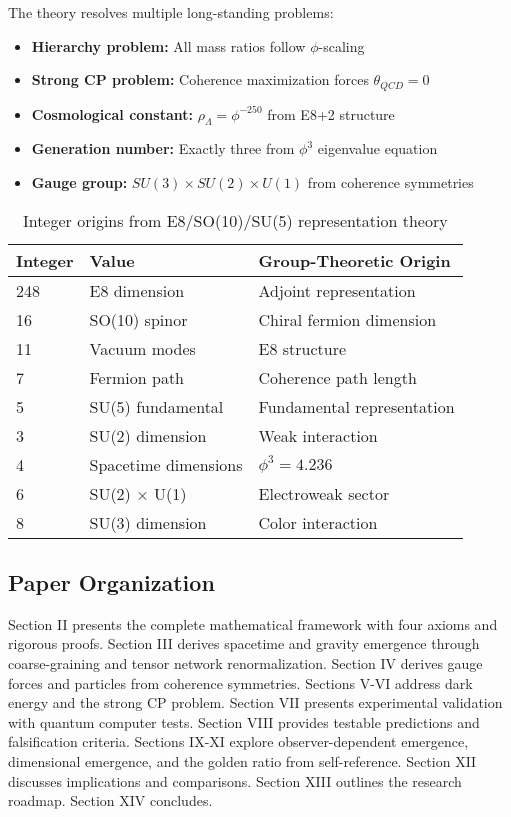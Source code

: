 \documentclass[11pt]{article}
\theoremstyle{definition}
\newcommand{\goldenratio}{\phi}
\begin{document}
The theory resolves multiple long-standing problems:
\begin{itemize}
\item \textbf{Hierarchy problem:} All mass ratios follow $\goldenratio$-scaling
\item \textbf{Strong CP problem:} Coherence maximization forces $\theta_{QCD} = 0$
\item \textbf{Cosmological constant:} $\rho_\Lambda = \goldenratio^{-250}$ from E8+2 structure
\item \textbf{Generation number:} Exactly three from $\goldenratio^3$ eigenvalue equation
\item \textbf{Gauge group:} $SU(3) \times SU(2) \times U(1)$ from coherence symmetries
\end{itemize}

\begin{table}[h]
\centering
\caption{Integer origins from E8/SO(10)/SU(5) representation theory}
\label{tab:integer_origins}
\begin{tabular}{lll}
\toprule
\textbf{Integer} & \textbf{Value} & \textbf{Group-Theoretic Origin} \\
\midrule
248 & E8 dimension & Adjoint representation \\
16 & SO(10) spinor & Chiral fermion dimension \\
11 & Vacuum modes & E8 structure \\
7 & Fermion path & Coherence path length \\
5 & SU(5) fundamental & Fundamental representation \\
3 & SU(2) dimension & Weak interaction \\
4 & Spacetime dimensions & $\goldenratio^3 = 4.236$ \\
6 & SU(2) $\times$ U(1) & Electroweak sector \\
8 & SU(3) dimension & Color interaction \\
\bottomrule
\end{tabular}
\end{table}

\subsection{Paper Organization}

Section II presents the complete mathematical framework with four axioms and rigorous proofs. Section III derives spacetime and gravity emergence through coarse-graining and tensor network renormalization. Section IV derives gauge forces and particles from coherence symmetries. Sections V-VI address dark energy and the strong CP problem. Section VII presents experimental validation with quantum computer tests. Section VIII provides testable predictions and falsification criteria. Sections IX-XI explore observer-dependent emergence, dimensional emergence, and the golden ratio from self-reference. Section XII discusses implications and comparisons. Section XIII outlines the research roadmap. Section XIV concludes.
\end{document}
